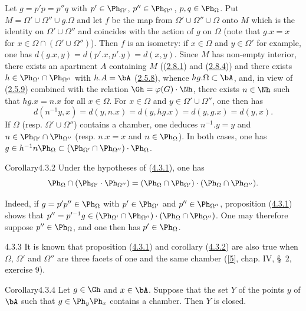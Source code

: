 \documentclass[12pt,a4paper,oneside,english]{smfart}
\makeatletter
\newcommand{\btanchor}[1]{\leavevmode\Hy@raisedlink{\hypertarget{bt:#1}{}}}
\newcommand{\btref}[1]{\hyperlink{bt:#1}{#1}}
\newcommand{\btbib}[1]{\hyperlink{bib:#1}{#1}}
\theoremstyle{definition}
\theoremstyle{bt}
\makeatother
\begin{document}
Let $g = p'p = p''q$ with $p'\in\Ph_{\Omega'}$, $p''\in\Ph_{\Omega''}$,
$p, q\in\Ph_{\Omega}$. Put $M = \Omega'\cup\Omega''\cup g.\Omega$ and let $f$
be the map from $\Omega'\cup\Omega''\cup\Omega$ onto $M$ which is the
identity on $\Omega'\cup\Omega''$ and coincides with the action of $g$ on
$\Omega$ (note that $g.x = x$ for $x\in\Omega\cap(\Omega'\cup\Omega'')$).
Then $f$ is an isometry: if $x\in\Omega$ and $y\in\Omega'$ for example, one
has $d(g.x, y) = d(p'.x, p'.y) = d(x,y)$. Since $M$ has non-empty interior,
there exists an apartment $A$ containing $M$ ((\btref{2.8.1}) and (\btref{2.8.4})) and there
exists $h\in\Ph_{\Omega'}\cap\Ph_{\Omega''}$ with $h.A = \bA$ (\btref{2.5.8}), whence
$hg.\Omega\subset\bA$, and, in view of (\btref{2.5.9}) combined with the relation
$\Gh = \varphi(G)\cdot\Nh$, there exists $n\in\Nh$ such that $hg.x = n.x$ for
all $x\in\Omega$. For $x\in\Omega$ and $y\in\Omega'\cup\Omega''$, one then
has
\[
d(n^{-1}y, x) = d(y, n.x) = d(y, hg.x) = d(y, g.x) = d(y,x).
\]
If $\Omega$ (resp. $\Omega'\cup\Omega''$) contains a chamber, one deduces
$n^{-1}.y = y$ and $n \in \Ph_{\Omega'}\cap\Ph_{\Omega''}$ (resp. $n.x = x$
and $n\in\Ph_{\Omega}$). In both cases, one has
$g \in h^{-1}n\Ph_{\Omega} \subset
(\Ph_{\Omega'}\cap\Ph_{\Omega''})\cdot\Ph_{\Omega}$.

\begin{state}{Corollary}{4.3.2}\btanchor{4.3.2}
Under the hypotheses of (\btref{4.3.1}), one has
\[
\Ph_{\Omega}\cap(\Ph_{\Omega'}\cdot\Ph_{\Omega''})
= (\Ph_{\Omega}\cap\Ph_{\Omega'})\cdot(\Ph_{\Omega}\cap\Ph_{\Omega''}).
\]
\end{state}

Indeed, if $g = p'p''\in\Ph_{\Omega}$ with $p'\in\Ph_{\Omega'}$ and
$p''\in\Ph_{\Omega''}$, proposition (\btref{4.3.1}) shows that
$p'' = p'^{-1}g \in
(\Ph_{\Omega'}\cap\Ph_{\Omega''})\cdot(\Ph_{\Omega}\cap\Ph_{\Omega''})$. One
may therefore suppose $p''\in\Ph_{\Omega}$, and one then has
$p'\in\Ph_{\Omega}$.

\num{4.3.3}\btanchor{4.3.3}
It is known that proposition (\btref{4.3.1}) and corollary (\btref{4.3.2}) are also true when
$\Omega$, $\Omega'$ and $\Omega''$ are three facets of one and the same
chamber ([\btbib{5}], chap. IV, \S~2, exercise 9).

\begin{state}{Corollary}{4.3.4}\btanchor{4.3.4}
Let $g\in\Gh$ and $x\in\bA$. Suppose that the set $Y$ of the points $y$ of
$\bA$ such that $g\in\Ph_{y}\Ph_{x}$ contains a chamber. Then $Y$ is closed.
\end{state}
\end{document}
